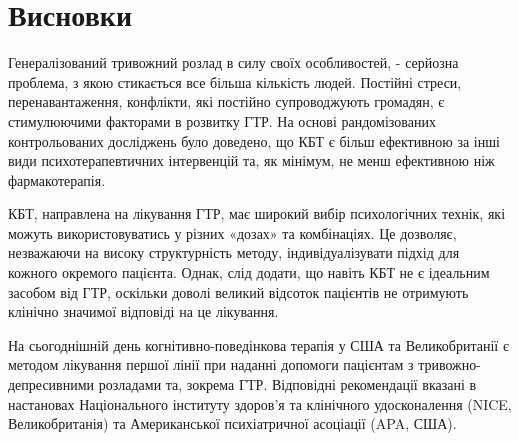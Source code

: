 \documentclass[twocolumn]{article}
\begin{document}
\section{Висновки}
\par Генералізований тривожний розлад в силу своїх особливостей, - серйозна проблема, з якою стикається все більша кількість людей. Постійні стреси, перенавантаження, конфлікти, які постійно супроводжують громадян, є стимулюючими факторами в розвитку ГТР. На основі рандомізованих контрольованих досліджень було доведено, що КБТ є більш ефективною за інші види психотерапевтичних інтервенцій та, як мінімум, не менш ефективною ніж фармакотерапія.
\par КБТ, направлена на лікування ГТР, має широкий вибір психологічних технік, які можуть використовуватись у різних «дозах» та комбінаціях. Це дозволяє, незважаючи на високу структурність методу, індивідуалізувати підхід для кожного окремого пацієнта. Однак, слід додати, що навіть КБТ не є ідеальним засобом від ГТР, оскільки доволі великий відсоток пацієнтів не отримують клінічно значимої відповіді на це лікування.
\par На сьогоднішній день когнітивно-поведінкова терапія у США та Великобританії є методом лікування першої лінії при наданні допомоги пацієнтам з тривожно-депресивними розладами та, зокрема ГТР. Відповідні рекомендації вказані в настановах Національного інституту здоров’я та клінічного удосконалення (NICE, Великобританія) та Американської психіатричної асоціації (APA, США).


\end{document}
